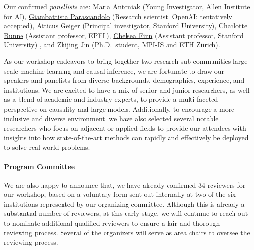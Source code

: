 \documentclass{article}
\begin{document}
Our confirmed \textit{panellists} are:
\href{https://maria-antoniak.github.io/}{Maria Antoniak} (Young Investigator, Allen Institute for AI),
\href{https://sites.google.com/view/giambattista-parascandolo/home}{Giambattista Parascandolo} (Research scientist, OpenAI; tentatively accepted),
\href{https://atticusg.github.io/}{Atticus Geiger} (Principal investigator, Stanford University),
\href{https://www.bunnelab.com/}{Charlotte Bunne} (Assistant professor, EPFL),
\href{https://ai.stanford.edu/~cbfinn/}{Chelsea Finn} (Assistant professor, Stanford University) , and
\href{https://zhijing-jin.com/}{Zhijing Jin} (Ph.D.\ student, MPI-IS and ETH Zürich).


As our workshop endeavors to bring together two research sub-communities large-scale machine learning and causal inference, we are fortunate to draw our speakers and panelists from diverse backgrounds, demographics, experience, and institutions.
We are excited to have a mix of senior and junior researchers, as well as a blend of academic and industry experts, to provide a multi-faceted perspective on causality and large models.
Additionally, to encourage a more inclusive and diverse environment, we have also selected several notable researchers who focus on adjacent or applied fields to provide our attendees with insights into how state-of-the-art methods can rapidly and effectively be deployed to solve real-world problems.


\paragraph*{Program Committee}

We are also happy to announce that, we have already confirmed 34 reviewers for our workshop, based on a voluntary form sent out internally at two of the six institutions represented by our organizing committee. Although this is already a substantial number of reviewers, at this early stage, we will continue to reach out to nominate additional qualified reviewers 
to ensure a fair and thorough reviewing process.
Several of the organizers will serve as area chairs to oversee the reviewing process.


\end{document}
